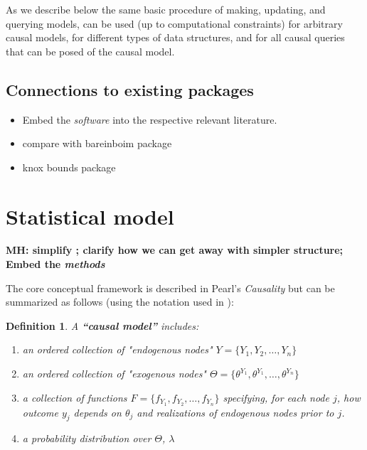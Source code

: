 \documentclass[
  11pt,
  article]{jss}
\newtheorem{definition}{Definition}
\begin{document}
As we describe below the same basic procedure of making, updating, and
querying models, can be used (up to computational constraints) for
arbitrary causal models, for different types of data structures, and for
all causal queries that can be posed of the causal model.

\hypertarget{connections-to-existing-packages}{%
\subsection{Connections to existing
packages}\label{connections-to-existing-packages}}

\begin{itemize}
\item
  Embed the \emph{software} into the respective relevant literature.
\item
  compare with bareinboim package
\item
  knox bounds package
\end{itemize}

\hypertarget{statistical-model}{%
\section{Statistical model}\label{statistical-model}}

\textbf{MH: simplify ; clarify how we can get away with simpler
structure; Embed the \emph{methods}}

The core conceptual framework is described in Pearl's \emph{Causality}
\citep{pearl2009causality} but can be summarized as follows (using the
notation used in \citet{ii2023}):

\begin{definition}
  
  A \textbf{``causal model''} includes:
  \begin{enumerate}
    \item an ordered collection of "endogenous nodes" $Y = \{Y_1, Y_2, \dots, Y_n\}$
    \item an ordered collection of "exogenous nodes" $\Theta = \{\theta^{Y_1}, \theta^{Y_1}, \dots, \theta^{Y_n}\}$
    \item a collection of functions $F = \{f_{Y_1}, f_{Y_2}, \dots, f_{Y_n}\}$ specifying, for each node $j$, how outcome $y_j$ depends on $\theta_j$ and realizations of endogenous nodes prior to $j$.
    \item a probability distribution over $\Theta$, $\lambda$
  \end{enumerate}
  
\end{definition}
\end{document}
